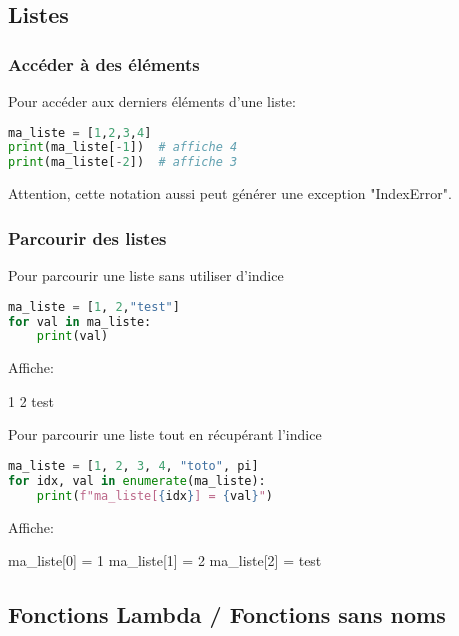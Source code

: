 \subsection{Listes}

\subsubsection{Accéder à des éléments}

Pour accéder aux derniers éléments d'une liste:

\begin{lstlisting}[language=Python]
ma_liste = [1,2,3,4]
print(ma_liste[-1])  # affiche 4
print(ma_liste[-2])  # affiche 3
\end{lstlisting}

Attention, cette notation aussi peut générer une exception "IndexError".

\subsubsection{Parcourir des listes}

Pour parcourir une liste sans utiliser d'indice
\begin{lstlisting}[language=Python]
ma_liste = [1, 2,"test"]
for val in ma_liste:
    print(val)
\end{lstlisting}
Affiche:
\begin{terminal}
1
2
test
\end{terminal}

Pour parcourir une liste tout en récupérant l'indice
\begin{lstlisting}[language=Python]
ma_liste = [1, 2, 3, 4, "toto", pi]
for idx, val in enumerate(ma_liste):
    print(f"ma_liste[{idx}] = {val}")
\end{lstlisting}
Affiche:
\begin{terminal}
ma_liste[0] = 1
ma_liste[1] = 2
ma_liste[2] = test
\end{terminal}




\subsection{Fonctions Lambda / Fonctions sans noms}




